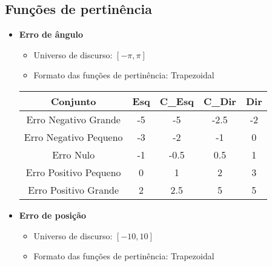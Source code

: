     \subsection{Funções de pertinência}
    \begin{itemize}
        \item{\bf{Erro de ângulo}}
            \begin{itemize}
                \item Universo de discurso: $[-\pi,\pi]$
                \item Formato das funções de pertinência: Trapezoidal
            \end{itemize}  
            
            \begin{table}[H]
                \centering
                \begin{tabular}{|c|c|c|c|c|}
                    \hline
                    Conjunto               & Esq   & C\_Esq & C\_Dir & Dir \\ \hline
                    Erro Negativo Grande   & -5    & -5    & -2.5  & -2    \\
                    Erro Negativo Pequeno  & -3    & -2    & -1    & 0     \\
                    Erro  Nulo             & -1    & -0.5  & 0.5   & 1     \\
                    Erro Positivo Pequeno  & 0     & 1     & 2     & 3     \\
                    Erro Positivo Grande   & 2     & 2.5   & 5     & 5     \\ \hline
                \end{tabular}
            \end{table}
            
        \item{\bf{Erro de posição}}
            \begin{itemize}
                \item Universo de discurso: $[-10,10]$
                \item Formato das funções de pertinência: Trapezoidal
            \end{itemize}


\end{itemize}
